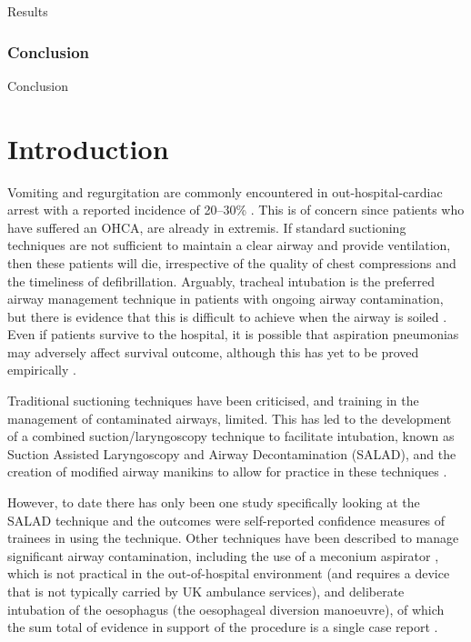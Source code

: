 \documentclass[]{article}
\begin{document}
Results

\hypertarget{conclusion}{%
\subsubsection{Conclusion}\label{conclusion}}

Conclusion

\hypertarget{intro}{%
\section{Introduction}\label{intro}}

Vomiting and regurgitation are commonly encountered in
out-hospital-cardiac arrest with a reported incidence of 20--30\%
\citep{voss_how_2014, simons_incidence_2007}. This is of concern since
patients who have suffered an OHCA, are already in extremis. If standard
suctioning techniques are not sufficient to maintain a clear airway and
provide ventilation, then these patients will die, irrespective of the
quality of chest compressions and the timeliness of defibrillation.
Arguably, tracheal intubation is the preferred airway management
technique in patients with ongoing airway contamination, but there is
evidence that this is difficult to achieve when the airway is soiled
\citep{sakles_impact_2017}. Even if patients survive to the hospital, it
is possible that aspiration pneumonias may adversely affect survival
outcome, although this has yet to be proved empirically
\citep{christ_early-onset_2016}.

Traditional suctioning techniques have been criticised, and training in
the management of contaminated airways, limited. This has led to the
development of a combined suction/laryngoscopy technique to facilitate
intubation, known as Suction Assisted Laryngoscopy and Airway
Decontamination (SALAD), and the creation of modified airway manikins to
allow for practice in these techniques \citep{ducanto_novel_2017}.

However, to date there has only been one study specifically looking at
the SALAD technique and the outcomes were self-reported confidence
measures of trainees in using the technique. Other techniques have been
described to manage significant airway contamination, including the use
of a meconium aspirator \citep{kei_comparing_2017}, which is not
practical in the out-of-hospital environment (and requires a device that
is not typically carried by UK ambulance services), and deliberate
intubation of the oesophagus (the oesophageal diversion manoeuvre), of
which the sum total of evidence in support of the procedure is a single
case report \citep{kornhall_intentional_2015}.
\end{document}
